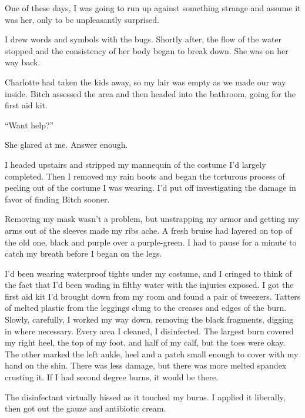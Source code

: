 One of these days, I was going to run up against something strange and assume it was her, only to be unpleasantly surprised.



I drew words and symbols with the bugs.  Shortly after, the flow of the water stopped and the consistency of her body began to break down.  She was on her way back.



Charlotte had taken the kids away, so my lair was empty as we made our way inside.  Bitch assessed the area and then headed into the bathroom, going for the first aid kit.



``Want help?''



She glared at me.  Answer enough.



I headed upstairs and stripped my mannequin of the costume I'd largely completed.  Then I removed my rain boots and began the torturous process of peeling out of the costume I was wearing.  I'd put off investigating the damage in favor of finding Bitch sooner.



Removing my mask wasn't a problem, but unstrapping my armor and getting my arms out of the sleeves made my ribs ache.  A fresh bruise had layered on top of the old one, black and purple over a purple-green.  I had to pause for a minute to catch my breath before I began on the legs.



I'd been wearing waterproof tights under my costume, and I cringed to think of the fact that I'd been wading in filthy water with the injuries exposed.  I got the first aid kit I'd brought down from my room and found a pair of tweezers.  Tatters of melted plastic from the leggings clung to the creases and edges of the burn.  Slowly, carefully, I worked my way down, removing the black fragments, digging in where necessary.  Every area I cleaned, I disinfected.  The largest burn covered my right heel, the top of my foot, and half of my calf, but the toes were okay.  The other marked the left ankle, heel and a patch small enough to cover with my hand on the shin.  There was less damage, but there was more melted spandex crusting it.  If I had second degree burns, it would be there.



The disinfectant virtually hissed as it touched my burns.  I applied it liberally, then got out the gauze and antibiotic cream.



